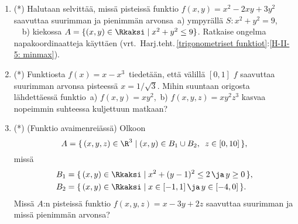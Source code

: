 \begin{enumerate}
\item (*)
Halutaan selvittää, missä pisteissä funktio $f(x,y)=x^2-2xy+3y^2$ saavuttaa suurimman ja 
pienimmän arvonsa\, a) ympyrällä \mbox{$S: x^2+y^2=9$}, \ \ b) kiekossa 
$A=\{(x,y)\in\Rkaksi \mid x^2+y^2 \le 9\}$. Ratkaise ongelma napakoordinaatteja käyttäen 
(vrt.\ Harj.teht.\,\ref{trigonometriset funktiot}:\ref{H-II-5: minmax}).

\item (*)
Funktiosta $f(x)=x-x^3\,$ tiedetään, että välillä $[0,1]$ $f$ saavuttaa suurimman arvonsa
pisteessä $x=1/\sqrt{3}$. Mihin suuntaan origosta lähdettäessä funktio\, a) $f(x,y)=xy^2$,\,
b) $f(x,y,z)=xy^2z^3$ kasvaa nopeimmin suhteessa kuljettuun matkaan?

\item (*)  
(Funktio avaimenreiässä) Olkoon
\[
A=\{\,(x,y,z)\in \R^3 \mid (x,y)\in B_1 \cup B_2,\,\ z\in[0,10]\,\},
\]
missä 
\begin{align*}
B_1 &= \{\,(x,y)\in\Rkaksi \mid x^2+(y-1)^2 \le 2\,\ja\, y \ge 0\,\}, \\
B_2 &= \{\,(x,y)\in\Rkaksi \mid x\in[-1,1]\,\ja\,y\in [-4,0]\,\}.
\end{align*}
Missä $A$:n pisteissä funktio $f(x,y,z)=x-3y+2z$ saavuttaa suurimman ja missä pienimmän arvonsa?

\end{enumerate}

